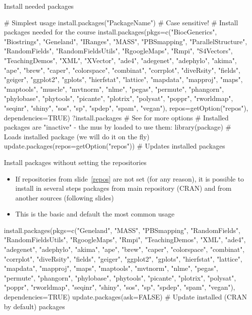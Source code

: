 \documentclass[compress, ucs, xelatex, 11pt, xcolor=svgnames,
  hyperref={
    bookmarks=true,
    unicode=true,
    colorlinks=true,
    pdftitle={Molecular data in R},
    plainpages=false,
    pdfauthor={Vojtech Zeisek},
    pdfsubject={Course about phylogeny and evolution in R},
    pdfcreator={XeLaTeX},
    pdfkeywords={R, evolution, phylogeny, molecular data},
    linkcolor=Tomato,
    anchorcolor=SaddleBrown,
    citecolor=Goldenrod,
    filecolor=DarkMagenta,
    menucolor=Sienna,
    urlcolor=DarkTurquoise,
    pdftex},
  url={hyphens, lowtilde} %
  ]{beamer}
\begin{document}
\begin{frame}[fragile]{Install needed packages}
  \begin{spluscode}
    # Simplest usage
    install.packages("PackageName") # Case sensitive!
    # Install packages needed for the course
    install.packages(pkgs=c("BiocGenerics", "Biostrings", "Geneland",
      "IRanges", "MASS", "PBSmapping", "ParallelStructure", "RandomFields",
      "RandomFieldsUtils", "RgoogleMaps", "Rmpi", "S4Vectors",
      "TeachingDemos", "XML", "XVector", "ade4", "adegenet", "adephylo",
      "akima", "ape", "brew", "caper", "colorspace", "combinat", "corrplot",
      "diveRsity", "fields", "geiger", "ggplot2", "gplots", "hierfstat",
      "lattice", "mapdata", "mapproj", "maps", "maptools", "muscle",
      "mvtnorm", "nlme", "pegas", "permute", "phangorn", "phylobase",
      "phytools", "picante", "plotrix", "polysat", "poppr", "rworldmap",
      "seqinr", "shiny", "sos", "sp", "spdep", "spam", "vegan"),
      repos=getOption("repos"), dependencies=TRUE)
    ?install.packages # See for more options
    # Installed packages are "inactive" - the mus by loaded to use them:
    library(package) # Loads installed package (we will do it on the fly)
    update.packages(repos=getOption("repos")) # Updates installed packages
  \end{spluscode}
\end{frame}

\begin{frame}[fragile]{Install packages without setting the repositories}
  \begin{itemize}
   \item If repositories from slide~\ref{repos} are not set (for any reason), it is possible to install in several steps packages from main repository (CRAN) and from another sources (following slides)
   \item This is the basic and default the most common usage
  \end{itemize}
  \begin{spluscode}
    install.packages(pkgs=c("Geneland", "MASS", "PBSmapping",
      "RandomFields", "RandomFieldsUtils", "RgoogleMaps", "Rmpi",
      "TeachingDemos", "XML", "ade4", "adegenet", "adephylo", "akima",
      "ape", "brew", "caper", "colorspace", "combinat", "corrplot",
      "diveRsity", "fields", "geiger", "ggplot2", "gplots", "hierfstat",
      "lattice", "mapdata", "mapproj", "maps", "maptools", "mvtnorm",
      "nlme", "pegas", "permute", "phangorn", "phylobase", "phytools",
      "picante", "plotrix", "polysat", "poppr", "rworldmap", "seqinr",
      "shiny", "sos", "sp", "spdep", "spam", "vegan"), dependencies=TRUE)
    update.packages(ask=FALSE) # Update installed (CRAN by default) packages
  \end{spluscode}
\end{frame}
\end{document}
